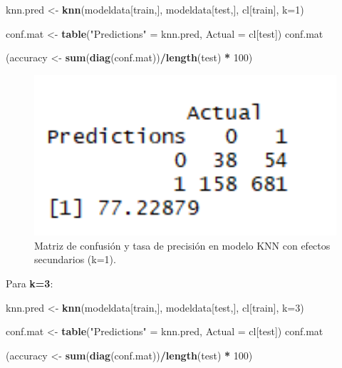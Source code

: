 \documentclass[spanish,]{article}
\newenvironment{Shaded}{\begin{snugshade}}{\end{snugshade}}
\newcommand{\KeywordTok}[1]{\textcolor[rgb]{0.13,0.29,0.53}{\textbf{#1}}}
\newcommand{\DataTypeTok}[1]{\textcolor[rgb]{0.13,0.29,0.53}{#1}}
\newcommand{\DecValTok}[1]{\textcolor[rgb]{0.00,0.00,0.81}{#1}}
\newcommand{\StringTok}[1]{\textcolor[rgb]{0.31,0.60,0.02}{#1}}
\newcommand{\OperatorTok}[1]{\textcolor[rgb]{0.81,0.36,0.00}{\textbf{#1}}}
\newcommand{\NormalTok}[1]{#1}
\begin{document}
\begin{Shaded}
\begin{Highlighting}[]
\NormalTok{knn.pred <-}\StringTok{ }\KeywordTok{knn}\NormalTok{(modeldata[train,], modeldata[test,], cl[train], }\DataTypeTok{k=}\DecValTok{1}\NormalTok{) }

\NormalTok{conf.mat <-}\StringTok{ }\KeywordTok{table}\NormalTok{(}\StringTok{"Predictions"}\NormalTok{ =}\StringTok{ }\NormalTok{knn.pred, }\DataTypeTok{Actual =}\NormalTok{ cl[test])}
\NormalTok{conf.mat}

\NormalTok{(accuracy <-}\StringTok{ }\KeywordTok{sum}\NormalTok{(}\KeywordTok{diag}\NormalTok{(conf.mat))}\OperatorTok{/}\KeywordTok{length}\NormalTok{(test) }\OperatorTok{*}\StringTok{ }\DecValTok{100}\NormalTok{)}
\end{Highlighting}
\end{Shaded}

\begin{figure}[h]
    \centering
    \includegraphics[width=1\textwidth]{figuras/KNN/effects_k1.png}
    \caption{Matriz de confusión y tasa de precisión en modelo KNN con efectos secundarios (k=1).}
    \label{fig:KNN:effectsK1}
\end{figure}

Para \textbf{k=3}:

\begin{Shaded}
\begin{Highlighting}[]
\NormalTok{knn.pred <-}\StringTok{ }\KeywordTok{knn}\NormalTok{(modeldata[train,], modeldata[test,], cl[train], }\DataTypeTok{k=}\DecValTok{3}\NormalTok{) }

\NormalTok{conf.mat <-}\StringTok{ }\KeywordTok{table}\NormalTok{(}\StringTok{"Predictions"}\NormalTok{ =}\StringTok{ }\NormalTok{knn.pred, }\DataTypeTok{Actual =}\NormalTok{ cl[test])}
\NormalTok{conf.mat}

\NormalTok{(accuracy <-}\StringTok{ }\KeywordTok{sum}\NormalTok{(}\KeywordTok{diag}\NormalTok{(conf.mat))}\OperatorTok{/}\KeywordTok{length}\NormalTok{(test) }\OperatorTok{*}\StringTok{ }\DecValTok{100}\NormalTok{)}
\end{Highlighting}
\end{Shaded}
\end{document}

